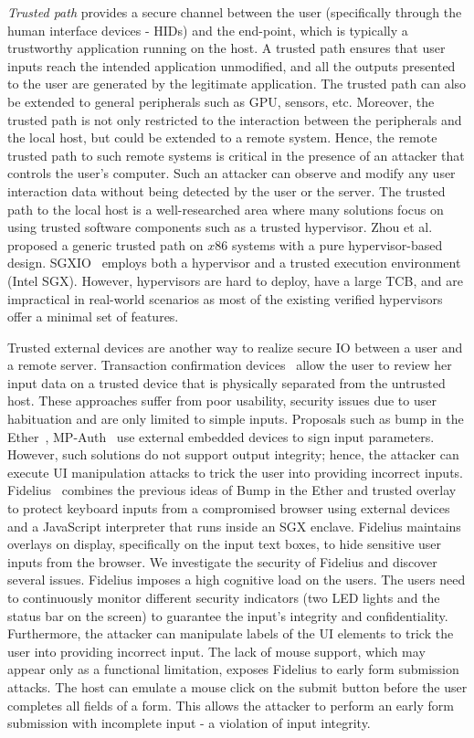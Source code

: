 \emph{Trusted path} provides a secure channel between the user (specifically through the human interface devices - HIDs) and the end-point, which is typically a trustworthy application running on the host. A trusted path ensures that user inputs reach the intended application unmodified, and all the outputs presented to the user are generated by the legitimate application. The trusted path can also be extended to general peripherals such as GPU, sensors, etc. Moreover, the trusted path is not only restricted to the interaction between the peripherals and the local host, but could be extended to a remote system. Hence, the remote trusted path to such remote systems is critical in the presence of an attacker that controls the user's computer. Such an attacker can observe and modify any user interaction data without being detected by the user or the server. The trusted path to the local host is a well-researched area where many solutions focus on using trusted software components such as a trusted hypervisor. Zhou et al.~\cite{zhou2012building} proposed a generic trusted path on $x86$ systems with a pure hypervisor-based design. SGXIO~\cite{weiser2017sgxio} employs both a hypervisor and a trusted execution environment (Intel SGX). However, hypervisors are hard to deploy, have a large TCB, and are impractical in real-world scenarios as most of the existing verified hypervisors offer a minimal set of features.


Trusted external devices are another way to realize secure IO between a user and a remote server. Transaction confirmation devices~\cite{filyanov2011uni,weigold2011secure} allow the user to review her input data on a trusted device that is physically separated from the untrusted host. These approaches suffer from poor usability, security issues due to user habituation and are only limited to simple inputs. Proposals such as bump in the Ether~\cite{McCPerRei2006}, MP-Auth~\cite{mannan2007using} use external embedded devices to sign input parameters. However, such solutions do not support output integrity; hence, the attacker can execute UI manipulation attacks to trick the user into providing incorrect inputs. Fidelius~\cite{Fidelius} combines the previous ideas of Bump in the Ether and trusted overlay to protect keyboard inputs from a compromised browser using external devices and a JavaScript interpreter that runs inside an SGX enclave. Fidelius maintains overlays on display, specifically on the input text boxes, to hide sensitive user inputs from the browser. We investigate the security of Fidelius and discover several issues. Fidelius imposes a high cognitive load on the users. The users need to continuously monitor different security indicators (two LED lights and the status bar on the screen) to guarantee the input's integrity and confidentiality. Furthermore, the attacker can manipulate labels of the UI elements to trick the user into providing incorrect input. 
The lack of mouse support, which may appear only as a functional limitation, exposes Fidelius to early form submission attacks. The host can emulate a mouse click on the submit button before the user completes all fields of a form. This allows the attacker to perform an early form submission with incomplete input - a violation of input integrity. 

